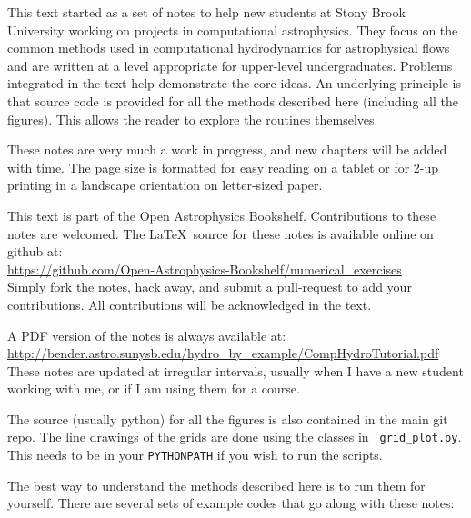 
This text started as a set of notes to help new students at Stony
Brook University working on projects in computational astrophysics.
They focus on the common methods used in computational hydrodynamics
for astrophysical flows and are written at a level appropriate for
upper-level undergraduates.  Problems integrated in the text help
demonstrate the core ideas.  An underlying principle is that source
code is provided for all the methods described here (including all the
figures).  This allows the reader to explore the routines themselves.

These notes are very much a work in progress, and new chapters will be
added with time.  The page size is formatted for easy reading
on a tablet or for 2-up printing in a landscape orientation on
letter-sized paper.  

This text is part of the Open Astrophysics Bookshelf.
Contributions to these notes are welcomed.  The \LaTeX\ source
for these notes is available online on github at: \\[0.25em]
%
\url{https://github.com/Open-Astrophysics-Bookshelf/numerical_exercises} \\[0.25em]
%
Simply fork the notes, hack away, and submit a pull-request to add
your contributions.  All contributions will be acknowledged in the text.


A PDF version of the notes is always available
at: \\[0.25em]
%
\url{http://bender.astro.sunysb.edu/hydro_by_example/CompHydroTutorial.pdf} \\[0.25em]
%
These notes are updated at irregular intervals, usually when I have a
new student working with me, or if I am using them for a course.

The source (usually python) for all the figures is also contained in
the main git repo.  The line drawings of the grids are done using the
classes in
\href{https://github.com/Open-Astrophysics-Bookshelf/numerical_exercises/blob/master/grid_plot.py}{{\tt
    grid\_plot.py}}.  This needs to be in your {\tt PYTHONPATH} if you
wish to run the scripts.

The best way to understand the methods described here is to run
them for yourself.  There are several sets of example codes that
go along with these notes:

